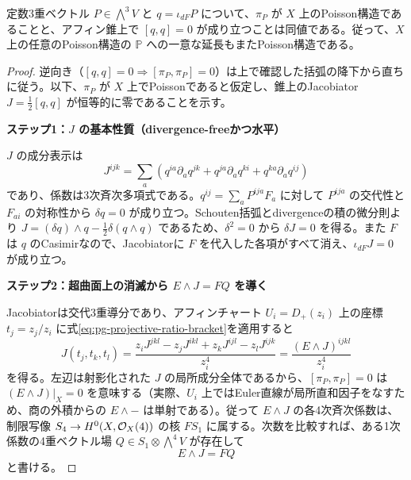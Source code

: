 \begin{proposition}\label{prop:pg-jacobi-extension}
定数3重ベクトル $P\in\bigwedge^3V$ と $q=\iota_{dF}P$ について、$\pi_P$ が $X$ 上のPoisson構造であることと、アフィン錐上で $[q,q]=0$ が成り立つことは同値である。従って、$X$ 上の任意のPoisson構造の $\mathbb P$ への一意な延長もまたPoisson構造である。
\end{proposition}
\begin{proof}
逆向き（$[q,q]=0\Rightarrow[\pi_P,\pi_P]=0$）は上で確認した括弧の降下から直ちに従う。以下、$\pi_P$ が $X$ 上でPoissonであると仮定し、錐上のJacobiator $J=\tfrac12[q,q]$ が恒等的に零であることを示す。

\par\medskip\noindent\textbf{ステップ1：$J$ の基本性質（divergence-freeかつ水平）}\par\nobreak\smallskip
$J$ の成分表示は
\begin{equation}\label{eq:pg-jacobiator-coefficients}
J^{ijk}=\sum_a\left(
q^{ia}\partial_aq^{jk}+q^{ja}\partial_aq^{ki}
+q^{ka}\partial_aq^{ij}\right)
\end{equation}
であり、係数は3次斉次多項式である。$q^{ij}=\sum_a P^{ija}F_a$ に対して $P^{ija}$ の交代性と $F_{ai}$ の対称性から $\delta q=0$ が成り立つ。Schouten括弧とdivergenceの積の微分則より $J=(\delta q)\wedge q-\tfrac12\delta(q\wedge q)$ であるため、$\delta^2=0$ から $\delta J=0$ を得る。また $F$ は $q$ のCasimirなので、Jacobiatorに $F$ を代入した各項がすべて消え、$\iota_{dF}J=0$ が成り立つ。

\par\medskip\noindent\textbf{ステップ2：超曲面上の消滅から $E\wedge J=FQ$ を導く}\par\nobreak\smallskip
Jacobiatorは交代3重導分であり、アフィンチャート $U_i=D_+(z_i)$ 上の座標 $t_j=z_j/z_i$ に式\eqref{eq:pg-projective-ratio-bracket}を適用すると
\begin{equation}\label{eq:pg-projective-ratio-jacobi}
J(t_j,t_k,t_l)=
\frac{z_iJ^{jkl}-z_jJ^{ikl}+z_kJ^{ijl}-z_lJ^{ijk}}{z_i^4}
=\frac{(E\wedge J)^{ijkl}}{z_i^4}
\end{equation}
を得る。左辺は射影化された $J$ の局所成分全体であるから、$[\pi_P,\pi_P]=0$ は $(E\wedge J)|_X=0$ を意味する（実際、$U_i$ 上ではEuler直線が局所直和因子をなすため、商の外積からの $E\wedge-$ は単射である）。従って $E\wedge J$ の各4次斉次係数は、制限写像 $S_4\to H^0(X,\mathcal O_X(4))$ の核 $FS_1$ に属する。次数を比較すれば、ある1次係数の4重ベクトル場 $Q\in S_1\otimes\bigwedge^4V$ が存在して
\begin{equation}\label{eq:pg-euler-jacobi-divisibility}
E\wedge J=FQ
\end{equation}
と書ける。


\end{proof}
